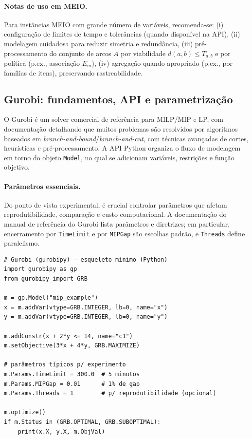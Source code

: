 \paragraph{Notas de uso em MEIO.}
Para instâncias MEIO com grande número de variáveis, recomenda-se: (i) configuração de limites de tempo e tolerâncias (quando disponível na API), (ii) modelagem cuidadosa para reduzir simetria e redundância, (iii) pré-processamento do conjunto de arcos \(A\) por viabilidade \(d(a,b)\le T_{a,b}\) e por política (p.ex., associação \(E_m\)), (iv) agregação quando apropriado (p.ex., por famílias de itens), preservando rastreabilidade. \cite{AhujaMagnantiOrlin1993NetworkFlows,Shapiro2001ModelingSupplyChain}

\subsection{Gurobi: fundamentos, API e parametrização}

O Gurobi é um solver comercial de referência para MILP/MIP e LP, com documentação detalhando que muitos problemas são resolvidos por algoritmos baseados em \emph{branch-and-bound}/\emph{branch-and-cut}, com técnicas avançadas de cortes, heurísticas e pré-processamento. \cite{GurobiMIPPrimer} A API Python organiza o fluxo de modelagem em torno do objeto \texttt{Model}, no qual se adicionam variáveis, restrições e função objetivo. \cite{GurobiPythonAPI} 

\paragraph{Parâmetros essenciais.}
Do ponto de vista experimental, é crucial controlar parâmetros que afetam reprodutibilidade, comparação e custo computacional. A documentação do manual de referência do Gurobi lista parâmetros e diretrizes; em particular, encerramento por \texttt{TimeLimit} e por \texttt{MIPGap} são escolhas padrão, e \texttt{Threads} define paralelismo. \cite{GurobiParamReference,GurobiParamGuidelines}

\begin{verbatim}
# Gurobi (gurobipy) – esqueleto mínimo (Python)
import gurobipy as gp
from gurobipy import GRB

m = gp.Model("mip_example")
x = m.addVar(vtype=GRB.INTEGER, lb=0, name="x")
y = m.addVar(vtype=GRB.INTEGER, lb=0, name="y")

m.addConstr(x + 2*y <= 14, name="c1")
m.setObjective(3*x + 4*y, GRB.MAXIMIZE)

# parâmetros típicos p/ experimento
m.Params.TimeLimit = 300.0  # 5 minutos
m.Params.MIPGap = 0.01      # 1% de gap
m.Params.Threads = 1        # p/ reprodutibilidade (opcional)

m.optimize()
if m.Status in (GRB.OPTIMAL, GRB.SUBOPTIMAL):
    print(x.X, y.X, m.ObjVal)
\end{verbatim}

